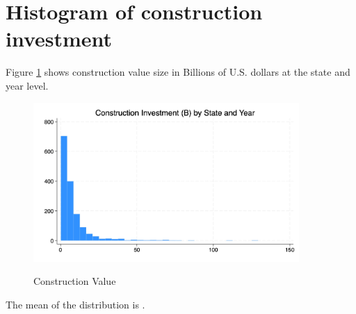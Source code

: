 \documentclass[12pt]{article}
\begin{document}
\section{Histogram of construction investment}
Figure \ref{fig:hist1} shows construction value size in Billions of U.S. dollars at the state and year level.
\vspace*{\baselineskip}

\begin{figure}[hp]
    \centering
    \caption{Construction Value} 
    \includegraphics[width=0.9\textwidth]{histinv.jpg}
    \label{fig:hist1}
\end{figure}
    \begin{center} \vspace*{-\baselineskip}
        \footnotesize {}
    \end{center}


The mean of the distribution is \MeanValue.
\end{document}
